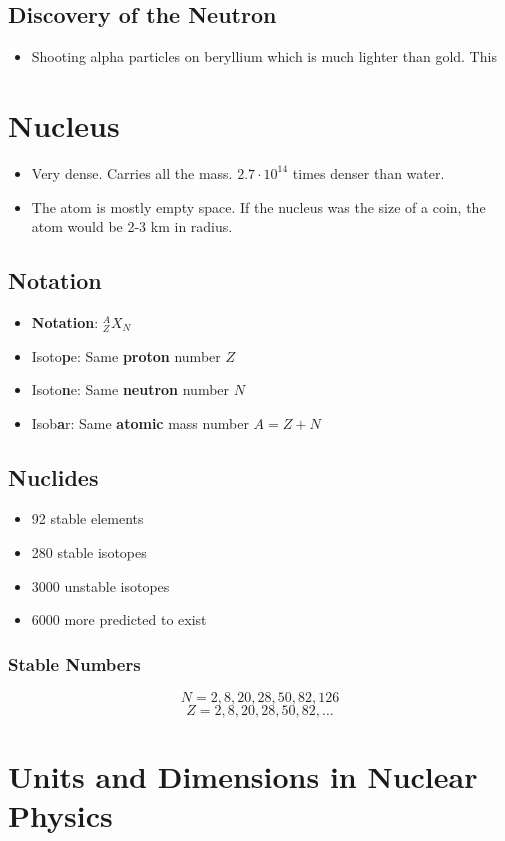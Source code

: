 \subsection{Discovery of the Neutron}
\begin{itemize}
    \item Shooting alpha particles on beryllium which is much lighter than gold. This 
\end{itemize}

\section{Nucleus}
\begin{itemize}
    \item Very dense. Carries all the mass. $2.7 ⋅ 10^{14}$ times denser than water.
    \item The atom is mostly empty space. If the nucleus was the size of a coin, the atom would be 2-3 km in radius. 
\end{itemize}
\subsection{Notation}
\begin{itemize}
    \item \textbf{Notation}: $_{Z}^{A}X_{N}$ 
    \item Isoto\textbf{p}e: Same \textbf{proton} number $Z$
    \item Isoto\textbf{n}e: Same \textbf{neutron} number $N$
    \item Isob\textbf{a}r: Same \textbf{atomic} mass number $A = Z + N$
\end{itemize}

\subsection{Nuclides}
\begin{itemize}
    \item 92 stable elements
    \item 280 stable isotopes
    \item 3000 unstable isotopes
    \item 6000 more predicted to exist
\end{itemize}
\subsubsection{Stable Numbers}
\[
N = 2, 8, 20, 28, 50, 82, 126
\]
\[
Z = 2, 8, 20, 28, 50, 82, \ldots     
\]
\section{Units and Dimensions in Nuclear Physics}